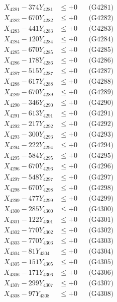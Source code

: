 \documentclass[a4paper,10pt]{article}
\begin{document}
{\begin{align}
\allowbreak
X_{4281} - 374Y_{4281} &\leq +0 && \text{(G4281)} \\
X_{4282} - 670Y_{4282} &\leq +0 && \text{(G4282)} \\
X_{4283} - 441Y_{4283} &\leq +0 && \text{(G4283)} \\
X_{4284} - 120Y_{4284} &\leq +0 && \text{(G4284)} \\
X_{4285} - 670Y_{4285} &\leq +0 && \text{(G4285)} \\
X_{4286} - 178Y_{4286} &\leq +0 && \text{(G4286)} \\
X_{4287} - 515Y_{4287} &\leq +0 && \text{(G4287)} \\
X_{4288} - 617Y_{4288} &\leq +0 && \text{(G4288)} \\
X_{4289} - 670Y_{4289} &\leq +0 && \text{(G4289)} \\
X_{4290} - 346Y_{4290} &\leq +0 && \text{(G4290)} \\
\allowbreak
X_{4291} - 613Y_{4291} &\leq +0 && \text{(G4291)} \\
X_{4292} - 217Y_{4292} &\leq +0 && \text{(G4292)} \\
X_{4293} - 300Y_{4293} &\leq +0 && \text{(G4293)} \\
X_{4294} - 222Y_{4294} &\leq +0 && \text{(G4294)} \\
X_{4295} - 584Y_{4295} &\leq +0 && \text{(G4295)} \\
X_{4296} - 670Y_{4296} &\leq +0 && \text{(G4296)} \\
X_{4297} - 548Y_{4297} &\leq +0 && \text{(G4297)} \\
X_{4298} - 670Y_{4298} &\leq +0 && \text{(G4298)} \\
X_{4299} - 477Y_{4299} &\leq +0 && \text{(G4299)} \\
X_{4300} - 285Y_{4300} &\leq +0 && \text{(G4300)} \\
\allowbreak
X_{4301} - 122Y_{4301} &\leq +0 && \text{(G4301)} \\
X_{4302} - 770Y_{4302} &\leq +0 && \text{(G4302)} \\
X_{4303} - 770Y_{4303} &\leq +0 && \text{(G4303)} \\
X_{4304} - 81Y_{4304} &\leq +0 && \text{(G4304)} \\
X_{4305} - 151Y_{4305} &\leq +0 && \text{(G4305)} \\
X_{4306} - 171Y_{4306} &\leq +0 && \text{(G4306)} \\
X_{4307} - 299Y_{4307} &\leq +0 && \text{(G4307)} \\
X_{4308} - 97Y_{4308} &\leq +0 && \text{(G4308)} \\

\end{align}}
\end{document}

